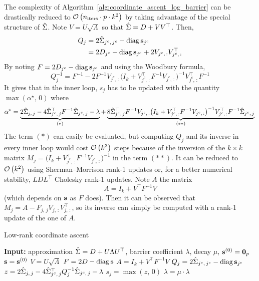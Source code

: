 The complexity of Algorithm~\ref{alg:coordinate_ascent_log_barrier} can be drastically reduced
to $\mathcal{O}\left( n_\text{iters} \cdot p \cdot k^2 \right)$
by taking advantage of the special structure of $\hat{\Sigma}$.
Note $V = U \sqrt{\Lambda}$ so that $\hat{\Sigma} = D + VV^\top$.
Then,
\begin{align*}
    Q_j &= 2\hat{\Sigma}_{j^c,\, j^c} - \operatorname*{diag}\mathbf{s}_{j^c}\\
    &= 2D_{j^c} - \operatorname*{diag}\mathbf{s}_{j^c} + 2V_{j^c,\, :}V_{j^c,\, :}^\top
\end{align*}
By noting $F = 2D_{j^c} - \operatorname*{diag}\mathbf{s}_{j^c}$ and using the Woodbury formula,
\begin{equation*}
    Q_j^{-1} =
        F^{-1} - 2F^{-1}V_{j^c,\, :}
            \big( I_k + V_{j^c,\, :}^\top F^{-1} V_{j^c,\, :} \big)^{-1}
                V_{j^c,\, :}^\top F^{-1}
\end{equation*}
It gives that in the inner loop, $s_j$ has to be updated with the quantity
$\max\left( \alpha^\star,\, 0 \right)$ where
\begin{equation*}
    \alpha^\star =
        \underbrace{
            2\hat{\Sigma}_{j,\, j}
            - 4\hat{\Sigma}_{j^c,\, j}^\top F^{-1} \hat{\Sigma}_{j^c,\, j}
            - \lambda
        }_\text{$(*)$}
        + \underbrace{
            8\hat{\Sigma}_{j^c,\, j}^\top F^{-1} V_{j^c,\, :}
            \big( I_k + V_{j^c,\, :}^\top F^{-1} V_{j^c,\, :} \big)^{-1}
            V_{j^c,\, :}^\top F^{-1}\hat{\Sigma}_{j^c,\, j}
        }_\text{$(**)$}\\
\end{equation*}
The term $(*)$ can easily be evaluated,
but computing $Q_j$ and its inverse in every inner loop would cost $\mathcal{O}\left( k^3 \right)$ steps
because of the inversion of the $k \times k$ matrix
$M_j = \big( I_k + V_{j^c,\, :}^\top F^{-1} V_{j^c,\, :} \big)^{-1}$
in the term $(**)$.
It can be reduced to $\mathcal{O}\left( k^2 \right)$ using Sherman–Morrison rank-1 updates or,
for a better numerical stability,
$LDL^\top$ Cholesky rank-1 updates.
Note $A$ the matrix
\begin{equation*}
    A = I_k + V^\top F^{-1} V
\end{equation*}
(which depends on $\mathbf{s}$ as $F$ does).
Then it can be observed that $M_j = A - F_{j,\, j} V_{j,\, :}V_{j,\, :}^\top$,
so its inverse can simply be computed with a rank-1 update of the one of $A$.
\begin{algorithm}
    \caption{Low-rank coordinate ascent}\label{alg:low_rank_coordinate_ascent}
    \begin{algorithmic}[1]
        \State \textbf{Input:} approximation $\hat{\Sigma} = D + U \Lambda U^\top$, barrier coefficient $\lambda$,
            decay $\mu$, $\mathbf{s}^{(0)} = \mathbf{0}_p$
        \State $\mathbf{s} = \mathbf{s}^{(0)}$
        \State $V = U \sqrt{\Lambda}$
        \State $F = 2D - \operatorname*{diag}\mathbf{s}$
        \State $A = I_k + V^\top F^{-1} V$
        \Repeat
        \State $Q_j = 2\hat{\Sigma}_{j^c,\, j^c} - \operatorname*{diag}\mathbf{s}_{j^c}$
        \State $z = 2\hat{\Sigma}_{j,\, j} - 4\hat{\Sigma}_{j^c,\, j}^\top Q_j^{-1} \hat{\Sigma}_{j^c,\, j} - \lambda$
        \State $s_j = \max\left( z,\, 0 \right)$
        \EndFor
        \State $\lambda = \mu \cdot \lambda$
    \end{algorithmic}
\end{algorithm}

